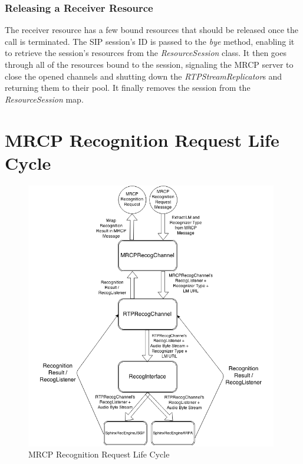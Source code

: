 \subsubsection{Releasing a Receiver Resource}
The receiver resource has a few bound resources that should be released once the call is terminated.
The SIP session's ID is passed to the \textit{bye} method, enabling it to retrieve the session's resources from the \textit{ResourceSession} class.
It then goes through all of the resources bound to the session, signaling the MRCP server to close the opened channels and shutting down the \textit{RTPStreamReplicator}s and returning them to their pool.
It finally removes the session from the \textit{ResourceSession} map.


\newpage
\section{MRCP Recognition Request Life Cycle}

\begin{figure}[h]
  \centering
  \includegraphics[width=11cm]{resources/images/MRCP-Recognition-Request-Lifecycle.png}
  \caption{MRCP Recognition Request Life Cycle}
  \label{fig:mrcprecognitionrequestlifecycle}
\end{figure}


